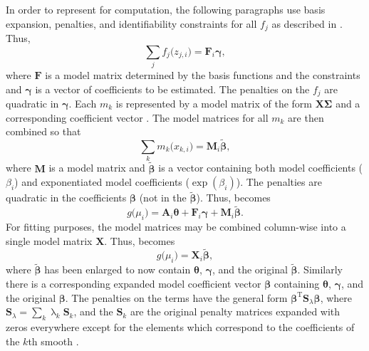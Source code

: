 In order to represent  for computation, the following paragraphs use basis expansion, penalties, and identifiability constraints for all \(f_j\) as described in \textcite{Wood2006}.  Thus, 
\begin{equation}
  \label{eq:SCAMCombinedModelMatricesfk}
  \sum_j f_j\bigl(z_{j, i}\bigr) = \symbf{F}_i \symbf{\gamma},
\end{equation}
where \(\symbf{F}\) is a model matrix determined by the basis functions and the constraints and \(\symbf{\gamma}\) is a vector of coefficients to be estimated.  The penalties on the \(f_j\) are quadratic in \(\symbf{\gamma}\).  Each \(m_k\) is represented by a model matrix of the form \(\symbf{X} \symbf{\Sigma}\) and a corresponding coefficient vector \parencite{Pya2015}.  The model matrices for all \(m_k\) are then combined so that
\begin{equation}
  \label{eq:SCAMCombinedModelMatricesMk}
  \sum_k m_k\bigl(x_{k, i}\bigr) = \symbf{M}_i \tilde{\symbf{\beta}},
\end{equation}
where \(\symbf{M}\) is a model matrix and \(\tilde{\symbf{\beta}}\) is a vector containing both model coefficients (\(\beta_i\)) and exponentiated model coefficients (\(\exp(\beta_i)\)).  The penalties are quadratic in the coefficients \(\symbf{\beta}\) (not in the \(\tilde{\symbf{\beta}}\)).  Thus,  becomes
\begin{equation}
  \label{eq:SCAMComputationalRepresentation01}
  g\bigl(\mu_i\bigr) = \symbf{A}_i \symbf{\theta} + \symbf{F}_i \symbf{\gamma} + \symbf{M}_i \tilde{\symbf{\beta}}.
\end{equation}
For fitting purposes, the model matrices may be combined column-wise into a single model matrix \(\symbf{X}\). Thus,  becomes
\begin{equation}
  \label{eq:SCAMComputationalRepresentation02}
  g\bigl(\mu_i\bigr) = \symbf{X}_i \tilde{\symbf{\beta}},
\end{equation}
where \(\tilde{\symbf{\beta}}\) has been enlarged to now contain \(\symbf{\theta}\), \(\symbf{\gamma}\), and the original \(\tilde{\symbf{\beta}}\).  Similarly there is a corresponding expanded model coefficient vector \(\symbf{\beta}\) containing \(\symbf{\theta}\), \(\symbf{\gamma}\), and the original \(\symbf{\beta}\).  The penalties on the terms have the general form \(\symbf{\beta}^{\text{T}} \symbf{S}_\lambda \symbf{\beta}\), where \(\symbf{S}_\lambda = \sum_k \uplambda_k \symbf{S}_k\), and the \(\symbf{S}_k\) are the original penalty matrices expanded with zeros everywhere except for the elements which correspond to the coefficients of the \(k\)th smooth \parencite{Pya2015}.

